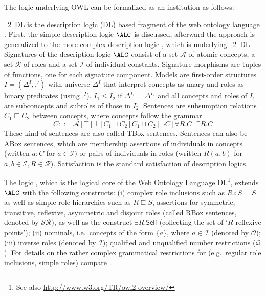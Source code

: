 \documentclass[10pt,fleqn,final]{scrreprt}
\makeatletter
\newcommand*\CommentAuthor{}
\renewcommand*\CommentAuthor{#1}}
\newcommand*\CommentDate{}
\renewcommand*\CommentDate{#1}}
\newcommand*\CommentId{}
\renewcommand*\CommentId{#1}}
\newcommand*\CommentType{}
\renewcommand*\CommentType{#1}}
\newcommand*{\SetCommentColorByType}[1]{%
\edef\localType{{#1}}%
\expandafter\ifstrequal\localType{q-aut}{\colorlet{CommentColor}{red}}{%
\expandafter\ifstrequal\localType{q-all}{\colorlet{CommentColor}{orange}}{%
\expandafter\ifstrequal\localType{todo}{\colorlet{CommentColor}{orange}}{%
\expandafter\ifstrequal\localType{fyi}{\colorlet{CommentColor}{lightgray}}{%
\colorlet{CommentColor}{yellow}}}}}}
\newcommand*{\SetCommentPrefixByType}[1]{%
\edef\localType{{#1}}%
\expandafter\@ifmtarg\localType{%
\edef\CommentPrefix{}%
}{%
\caseupper[q]{#1}%
\edef\CommentPrefix{\thestring: }%
}}
\newcommand*{\initComment}[1]{%
\setkeys{Comment}{#1}%
\SetCommentColorByType{\CommentType}%
\relax%
\SetCommentPrefixByType{\CommentType}%
\relax%
}
\newcommand*{\todonote}[2][]{%
\initComment{#1}%
\pdfcomment[author=\CommentAuthor,color=CommentColor,date=\CommentDate,id=\CommentId]{%
\CommentPrefix
#2}}
\renewcommand*{\todonote}[2][]{%
\initComment{#1}%
\ednote{\CommentPrefix #2}}
\newcommand*{\CLnote}[2][author=Christoph Lange]{%
\todonote[author=Christoph Lange,#1]{#2} 
}
\newenvironment{definitions}[0]{\medskip }{}
\makeatother
\begin{document}
\begin{definitions}
 The logic \SROIQ underlying 
OWL can be formalized as an institution as follows:
\begin{definition}\label{DL}  
\OWL~2~DL is the description logic (DL) based fragment of the web ontology language \OWL. 
 First, the simple description logic $\ALC$ is discussed, afterward the approach is generalized
to the more complex description logic \SROIQ{}, which is underlying \OWL~2~DL.
Signatures of the description logic $\ALC$ consist of a set  ${\mathcal A}$ of
atomic concepts, a set ${\mathcal R}$ of roles and a set ${\mathcal
I}$ of individual constants. Signature morphisms are tuples of
functions, one for each signature component.
Models are  first-order structures $I = (\Delta^I, .^I)$ with universe $\Delta^I$
that interpret concepts as unary and roles as binary predicates
(using $.^I$). $I_1\leq I_2$ if $\Delta^{I_1}=\Delta^{I_2}$ and all
concepts and roles of $I_1$ are subconcepts and subroles of those in $I_2$.
Sentences are subsumption relations $C_1\sqsubseteq C_2$ between
concepts, where concepts follow the grammar
$$C ::= {\mathcal A} \,|\, \top\,|\, \bot \,|\, C_1 \sqcup C_2 \,|\, C_1 \sqcap C_2 \,|\, \neg C 
    \,|\, \forall R . C \,|\, \exists R . C$$
These kind of sentences are also called TBox sentences.
 Sentences can also be ABox sentences, which are
membership assertions of individuals in concepts (written $a:C$ for
$a\in{\mathcal I})$ or pairs of individuals in roles (written $R(a,b)$
for $a,b\in{\mathcal I}, R\in{\mathcal R}$).   Satisfaction is the
standard satisfaction of description logics.

The logic \SROIQ \cite{SROIQ}, which is the logical core of the Web Ontology
Language  DL\footnote{See also \url{http://www.w3.org/TR/owl2-overview/}}, extends $\ALC$
with the following constructs: (i) complex role inclusions such as $R \circ S \sqsubseteq S$
as well as simple role hierarchies such as $R \sqsubseteq S$,
assertions for symmetric, transitive, reflexive, asymmetric and
disjoint roles (called RBox sentences, denoted by $\mathcal{SR}$), as well as the construct
$\exists R . \mathsf{Self}$ (collecting the set of `$R$-reflexive
points'); (ii) nominals, i.e.\ concepts of the form $\{a\}$, where $a\in\mathcal{I}$ (denoted by $\mathcal{O}$); (iii) inverse
roles (denoted by $\mathcal{I}$); qualified and unqualified number
restrictions ($\mathcal{Q}$). For details on the rather complex
grammatical restrictions for \SROIQ (e.g.\ regular role inclusions,
simple roles) compare \cite{SROIQ}.


\end{definition}
\end{definitions}
\end{document}
